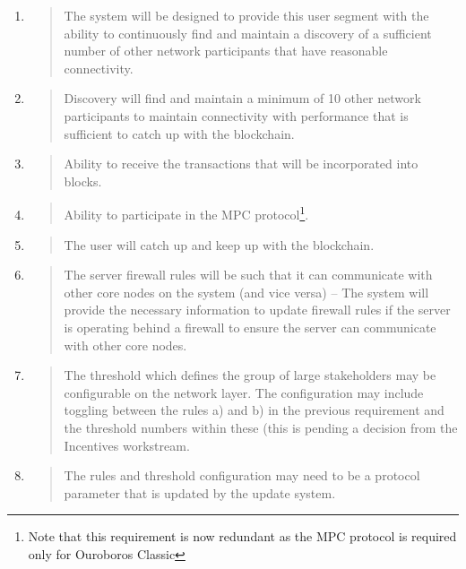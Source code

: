 \documentclass[]{article}
\begin{document}
\begin{enumerate}
\def\labelenumi{\arabic{enumi}.}
\setcounter{enumi}{3}
\item
  \begin{quote}
  The system will be designed to provide this user segment with the
  ability to continuously find and maintain a discovery of a sufficient
  number of other network participants that have reasonable
  connectivity.
  \end{quote}
\item
  \begin{quote}
  Discovery will find and maintain a minimum of 10 other network
  participants to maintain connectivity with performance that is
  sufficient to catch up with the blockchain.
  \end{quote}
\item
  \begin{quote}
  Ability to receive the transactions that will be incorporated into
  blocks.
  \end{quote}
\item
  \begin{quote}
  Ability to participate in the MPC protocol\footnote{Note that this
    requirement is now redundant as the MPC protocol is required only
    for Ouroboros Classic}.
  \end{quote}
\item
  \begin{quote}
  The user will catch up and keep up with the blockchain.
  \end{quote}
\item
  \begin{quote}
  The server firewall rules will be such that it can communicate with
  other core nodes on the system (and vice versa) -- The system will
  provide the necessary information to update firewall rules if the
  server is operating behind a firewall to ensure the server can
  communicate with other core nodes.
  \end{quote}
\item
  \begin{quote}
  The threshold which defines the group of large stakeholders may be
  configurable on the network layer. The configuration may include
  toggling between the rules a) and b) in the previous requirement and
  the threshold numbers within these (this is pending a decision from
  the Incentives workstream.
  \end{quote}
\item
  \begin{quote}
  The rules and threshold configuration may need to be a protocol
  parameter that is updated by the update system.
  \end{quote}
\end{enumerate}
\end{document}
